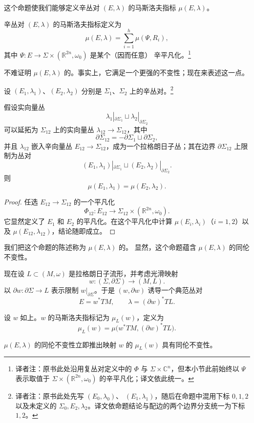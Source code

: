 这个命题使我们能够定义辛丛对 $(E,\lambda)$ 的马斯洛夫指标
$\mu(E,\lambda)$。

\begin{definition}
\label{def:symplectic-bundle-pair-maslov-index}
辛丛对 $(E,\lambda)$ 的马斯洛夫指标定义为
\begin{equation}
  \mu(E,\lambda)=\sum_{i=1}^h\mu(\Psi,R_i),
\label{eq:symplectic-bundle-pair-maslov-index}
\end{equation}
其中 $\Psi:E\to\Sigma\times(\mathbb R^{2n},\omega_0)$ 是某个（因而任意）
辛平凡化。\footnote{译者注：原书此处沿用复丛对定义中的 $\Phi$ 与
$\Sigma\times\mathbb C^n$，但本小节此前始终以 $\Psi$ 表示取值于
$\Sigma\times(\mathbb R^{2n},\omega_0)$ 的辛平凡化；译文依此统一。}
\end{definition}

不难证明 $\mu(E,\lambda)$ 的\termHomotopyInvariance{}。事实上，它满足一个更强的不变性；现在来表述这一点。

设 $(E_1,\lambda_1)$、$(E_2,\lambda_2)$ 分别是 $\Sigma_1$、$\Sigma_2$
上的辛丛对。\footnote{译者注：原书此处先写 $(E_0,\lambda_0)$、
$(E_1,\lambda_1)$，随后在命题中混用下标 $0,1,2$ 以及未定义的
$\Sigma_0,E_2,\lambda_2$。译文依命题结论与配边的两个边界分支统一为下标
$1,2$。}

\begin{proposition}
\label{prop:maslov-cobordism-invariance}
假设实向量丛
\[
  \lambda_1|_{\partial\Sigma_1}
  \sqcup
  \lambda_2|_{\partial\Sigma_2}
\]
可以延拓为\termOrientedCobordism{} $\Sigma_{12}$ 上的实向量丛
$\lambda_{12}\to\Sigma_{12}$，其中
\[
  \partial\Sigma_{12}
  =-\partial\Sigma_1\sqcup\partial\Sigma_2,
\]
并且 $\lambda_{12}$ 嵌入辛向量丛 $E_{12}\to\Sigma_{12}$，成为一个拉格朗日子丛；其在边界 $\partial\Sigma_{12}$ 上限制为丛对
\[
  (E_1,\lambda_1)|_{\partial\Sigma_1}
  \sqcup
  (E_2,\lambda_2)|_{\partial\Sigma_2}.
\]
则
\[
  \mu(E_1,\lambda_1)=\mu(E_2,\lambda_2).
\]
\end{proposition}

\begin{proof}
任选 $E_{12}\to\Sigma_{12}$ 的一个平凡化
\[
  \Phi_{12}:E_{12}
  \longrightarrow
  \Sigma_{12}\times(\mathbb R^{2n},\omega_0).
\]
它显然定义了 $E_1$ 和 $E_2$ 的平凡化。在这个平凡化中计算
$\mu(E_i,\lambda_i)$（$i=1,2$）以及 $\mu(E_{12},\lambda_{12})$，结论随即成立。
\end{proof}

我们把这个命题的陈述称为 $\mu(E,\lambda)$ 的\termCobordismInvariance{}。
显然，这个命题蕴含 $\mu(E,\lambda)$ 的同伦不变性。

现在设 $L\subset(M,\omega)$ 是拉格朗日子流形，并考虑光滑映射
\[
  w:(\Sigma,\partial\Sigma)\longrightarrow(M,L).
\]
以 $\partial w:\partial\Sigma\to L$ 表示限制 $w|_{\partial\Sigma}$。于是
$(w,\partial w)$ 诱导一个典范丛对
\[
  E=w^*TM,
  \qquad
  \lambda=(\partial w)^*TL.
\]

\begin{definition}
\label{def:maslov-index-map}
设 $w$ 如上。$w$ 的马斯洛夫指标记为 $\mu_L(w)$，定义为
\[
  \mu_L(w)=\mu\bigl(w^*TM,(\partial w)^*TL\bigr).
\]
\end{definition}

$\mu(E,\lambda)$ 的同伦不变性立即推出映射 $w$ 的 $\mu_L(w)$ 具有同伦不变性。

